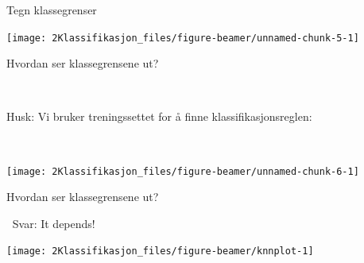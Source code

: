 \documentclass[10pt,ignorenonframetext,]{beamer}
\begin{document}
\begin{frame}

\begin{block}{Tegn klassegrenser}

\vspace{5mm}

\begin{center}\texttt{[image: 2Klassifikasjon\_files/figure-beamer/unnamed-chunk-5-1]} \end{center}

\end{block}

\end{frame}

\begin{frame}

\begin{block}{Hvordan ser klassegrensene ut?}

\(~\)

Husk: Vi bruker treningssettet for å finne klassifikasjonsreglen:

\(~\)

\begin{center}\texttt{[image: 2Klassifikasjon\_files/figure-beamer/unnamed-chunk-6-1]} \end{center}

\end{block}

\end{frame}

\begin{frame}

\begin{block}{Hvordan ser klassegrensene ut?}

\(~\) Svar: It depends!

\begin{center}\texttt{[image: 2Klassifikasjon\_files/figure-beamer/knnplot-1]} \end{center}

\end{block}

\end{frame}
\end{document}
